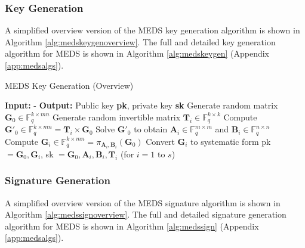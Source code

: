 \documentclass[11pt,a4paper]{report}
\theoremstyle{definition}
\begin{document}
\subsubsection{Key Generation}
A simplified overview version of the MEDS key generation algorithm is shown in Algorithm \ref{alg:medskeygenoverview}. The full and detailed key generation algorithm for MEDS is shown in Algorithm \ref{alg:medskeygen} (Appendix \ref{app:medsalgs}).

\begin{algorithm}
  \caption{MEDS Key Generation (Overview)}
  \label{alg:medskeygenoverview}
  \begin{algorithmic}[1]
    \State \textbf{Input:} -
    \State \textbf{Output:} Public key \textbf{pk}, private key \textbf{sk}
    \State Generate random matrix $\textbf{G}_0 \in \mathbb{F}_q^{k \times mn}$
      \State Generate random invertible matrix $\textbf{T}_i \in \mathbb{F}_q^{k \times k}$
      \State Compute $\textbf{G}'_{0} \in \mathbb{F}_q^{k \times mn} = \textbf{T}_i \times \textbf{G}_0$
      \State Solve $\textbf{G}'_{0}$ to obtain $\textbf{A}_i \in \mathbb{F}_q^{m \times m}$ and $\textbf{B}_i \in \mathbb{F}_q^{n \times n}$
      \State Compute $\textbf{G}_i \in \mathbb{F}_q^{k \times mn} = \pi_{\textbf{A}_i, \textbf{B}_i}(\textbf{G}_0)$
      \State Convert $\textbf{G}_i$ to systematic form
    \EndFor
    \State \Return pk $= \textbf{G}_0, \textbf{G}_i$, sk $= \textbf{G}_0, \textbf{A}_i, \textbf{B}_i, \textbf{T}_i$ (for $i = 1$ to $s$)
  \end{algorithmic}
\end{algorithm}

\subsubsection{Signature Generation}
A simplified overview version of the MEDS signature algorithm is shown in Algorithm \ref{alg:medssignoverview}. The full and detailed signature generation algorithm for MEDS is shown in Algorithm \ref{alg:medssign} (Appendix \ref{app:medsalgs}).
\end{document}
